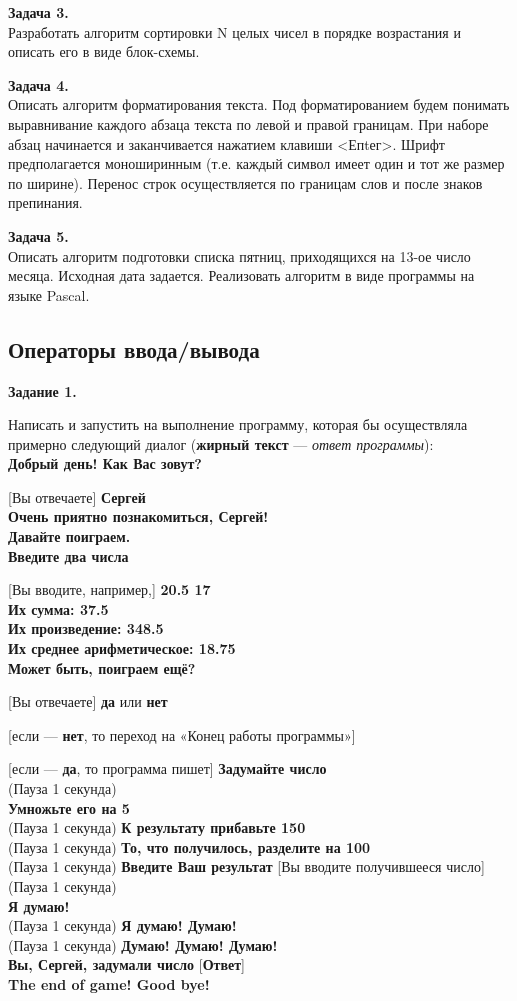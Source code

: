 {\bf Задача 3.}\\ 
Разработать алгоритм сортировки N целых чисел в порядке воз­растания и описать его в виде блок-схемы.

{\bf Задача 4.}\\ 
Описать алгоритм форматирования текста. Под форматированием будем понимать выравнивание каждого абзаца текста по левой и правой границам. При наборе абзац начинается и заканчивается нажатием клавиши <Епtег>. Шрифт предполагается моноширинным (т.е. каждый символ имеет один и тот же размер по ширине). Перенос строк осуществляется по границам слов и после знаков препинания.

{\bf Задача 5.}\\ 
Описать алгоритм подготовки списка пятниц, приходящихся на 13-ое число месяца. Исходная дата задается. Реализовать алго­ритм в виде программы на языке Pascal.

\subsection{Операторы ввода/вывода}

{\bf Задание 1.}

Написать и запустить на выполнение программу, которая бы осуществляла примерно следующий диалог ({\bf жирный текст} --- {\it ответ программы}):\\
{\bf Добрый день!  Как Вас зовут?}

  [Вы отвечаете] {\bf Сергей}\\
 {\bf Очень приятно познакомиться, Сергей! \\Давайте поиграем.}\\
 {\bf Введите два числа}
 
 [Вы вводите, например,]   {\bf 20.5 17}\\
 {\bf Их сумма: 37.5}\\
 {\bf Их произведение: 348.5}\\
 {\bf Их среднее арифметическое: 18.75}\\
 {\bf Может быть, поиграем ещё?}
 
[Вы отвечаете]  {\bf да}  или {\bf нет}

[если ---  {\bf нет},  то  переход на «Конец работы программы»]

[если ---  {\bf да}, то программа пишет] {\bf Задумайте число}\\
(Пауза 1 секунда)\\
 {\bf Умножьте его на 5}\\
(Пауза 1 секунда)  {\bf К результату прибавьте 150}\\
(Пауза 1 секунда)  {\bf То, что получилось, разделите на 100}\\
(Пауза 1 секунда)  {\bf Введите Ваш результат}  [Вы вводите получившееся число]\\
(Пауза 1 секунда)\\
 {\bf Я думаю!}\\
(Пауза 1 секунда)  {\bf Я думаю! Думаю!}\\
(Пауза 1 секунда)  {\bf Думаю! Думаю! Думаю!}\\
 {\bf Вы, Сергей, задумали число} [{\bf Ответ}]\\
 {\bf The end of game! Good bye!}\\

